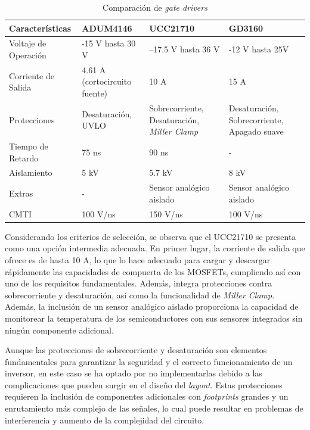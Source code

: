 \begin{table}[H]
	\centering
	\begin{tabular}{|l|p{3.5cm}|p{3.5cm}|p{3.5cm}|}
		\hline
		\textbf{Características} & \textbf{ADUM4146} & \textbf{UCC21710} & \textbf{GD3160} \\
		\hline
		Voltaje de Operación & -15 V hasta 30 V & –17.5 V hasta 36 V & -12 V hasta 25V \\
		\hline
		Corriente de Salida & 4.61 A (cortocircuito fuente) & 10 A & 15 A \\
		\hline
		Protecciones & Desaturación, UVLO & Sobrecorriente, Desaturación, \textit{Miller Clamp} & Desaturación, Sobrecorriente, Apagado suave \\
		\hline
		Tiempo de Retardo & 75 ns & 90 ns & - \\
		\hline
		Aislamiento & 5 kV & 5.7 kV & 8 kV \\
		\hline
		Extras & - & Sensor analógico aislado & Sensor analógico aislado \\
		\hline
		CMTI & 100 V/ns & 150 V/ns & 100 V/ns \\
		\hline
	\end{tabular}
	\caption{Comparación de \textit{gate drivers}}
\end{table}

Considerando los criterios de selección, se observa que el UCC21710 se presenta como una opción intermedia adecuada. En primer lugar, la corriente de salida que ofrece es de hasta 10 A, lo que lo hace adecuado para cargar y descargar rápidamente las capacidades de compuerta de los MOSFETs, cumpliendo así con uno de los requisitos fundamentales. Además, integra protecciones contra sobrecorriente y desaturación, así como la funcionalidad de \textit{Miller Clamp}. Además, la inclusión de un sensor analógico aislado proporciona la capacidad de monitorear la temperatura de los semiconductores con sus sensores integrados sin ningún componente adicional.

Aunque las protecciones de sobrecorriente y desaturación son elementos fundamentales para garantizar la seguridad y el correcto funcionamiento de un inversor, en este caso se ha optado por no implementarlas debido a las complicaciones que pueden surgir en el diseño del \textit{layout}. Estas protecciones requieren la inclusión de componentes adicionales con \textit{footprints} grandes y un enrutamiento más complejo de las señales, lo cual puede resultar en problemas de interferencia y aumento de la complejidad del circuito.

